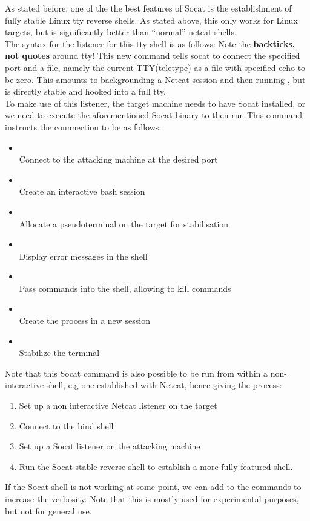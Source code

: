 {As stated before, one of the the best features of Socat is the establishment of fully stable Linux tty reverse shells. As stated above, this only works for Linux targets, but is significantly better than ``normal'' netcat shells. \\
The syntax for the listener for this tty shell is as follows:
Note the \textbf{backticks, not quotes} around tty!
This new command tells socat to connect the specified port and a file, namely the current TTY(teletype) as a file with specified echo to be zero. This amounts to backgrounding a Netcat session and then running , but is directly stable and hooked into a full tty.\\
To make use of this listener, the target machine needs to have Socat installed, or we need to execute the aforementioned Socat binary to then run 
This command instructs the connnection to be as follows: 
\begin{itemize}
\item {}\\
Connect to the attacking machine at the desired port
\item {}\\
Create an interactive bash session
\item {}\\
Allocate a pseudoterminal on the target for stabilisation
\item {}\\
Display error messages in the shell
\item {}\\
Pass  commands into the shell, allowing to kill commands
\item {}\\
Create the process in a new session
\item {}\\
Stabilize the terminal
\end{itemize}
Note that this Socat command is also possible to be run from within a non-interactive shell, e.g one established with Netcat, hence giving the process: 
\begin{enumerate}
\item Set up a non interactive Netcat listener on the target
\item Connect to the bind shell
\item Set up a Socat listener on the attacking machine
\item Run the Socat stable reverse shell to establish a more fully featured shell.
\end{enumerate}
If the Socat shell is not working at some point, we can add  to the commands to increase the verbosity. Note that this is mostly used for experimental purposes, but not for general use.
}
